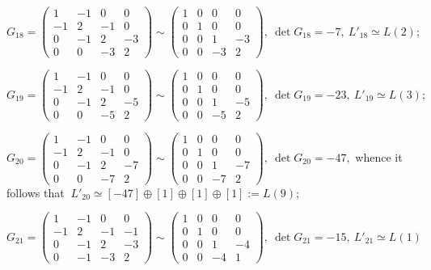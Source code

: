 \documentclass[14pt]{article}
\begin{document}
\begin{small}
$
G_{18} =
\begin{pmatrix}
1 & -1 & 0 & 0\\
-1 & 2 & -1 & 0\\
0 & -1 & 2 & -3\\
0 & 0 & -3 & 2
\end{pmatrix} \sim
\begin{pmatrix}
1 & 0 & 0 & 0\\
0 & 1 & 0 & 0\\
0 & 0 & 1 & -3\\
0 & 0 & -3 & 2
\end{pmatrix}, \ \det G_{18} = -7, \ L'_{18} \simeq L(2);
$

$
G_{19} =
\begin{pmatrix}
1 & -1 & 0 & 0\\
-1 & 2 & -1 & 0\\
0 & -1 & 2 & -5\\
0 & 0 & -5 & 2
\end{pmatrix} \sim
\begin{pmatrix}
1 & 0 & 0 & 0\\
0 & 1 & 0 & 0\\
0 & 0 & 1 & -5\\
0 & 0 & -5 & 2
\end{pmatrix}, \ \det G_{19} = -23, \ L'_{19} \simeq L(3);
$

$
G_{20} =
\begin{pmatrix}
1 & -1 & 0 & 0\\
-1 & 2 & -1 & 0\\
0 & -1 & 2 & -7\\
0 & 0 & -7 & 2
\end{pmatrix} \sim
\begin{pmatrix}
1 & 0 & 0 & 0\\
0 & 1 & 0 & 0\\
0 & 0 & 1 & -7\\
0 & 0 & -7 & 2
\end{pmatrix}, \ \det G_{20} = -47, $
\vskip 0.4cm
whence it follows that
$\ L'_{20} \simeq [-47] \oplus [1] \oplus [1] \oplus [1] := L(9)$;


\vskip 0.4cm
$
G_{21} =
\begin{pmatrix}
1 & -1 & 0 & 0\\
-1 & 2 & -1 & -1\\
0 & -1 & 2 & -3\\
0 & -1 & -3 & 2
\end{pmatrix} \sim
\begin{pmatrix}
1 & 0 & 0 & 0\\
0 & 1 & 0 & 0\\
0 & 0 & 1 & -4\\
0 & 0 & -4 & 1
\end{pmatrix}, \ \det G_{21} = -15, \ L'_{21} \simeq L(1)$


\end{small}
\end{document}
